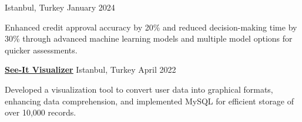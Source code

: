 \begin{cventries}
\cventry
    {} %
    {\href{https://github.com/hasantahabagci/Credit-Card-Approval-Prediction}{\textbf{}}} %
    {Istanbul, Turkey} %
    {January 2024} %
    {
      \begin{cvitems} %
        \item {Enhanced credit approval accuracy by 20\% and reduced decision-making time by 30\% through advanced machine learning models and multiple model options for quicker assessments.}
      \end{cvitems}
    }
\cventry
    {} %
    {\href{https://github.com/hasantahabagci/see-it-visualizer}{\textbf{\underline{See-It Visualizer}}}} %
    {Istanbul, Turkey} %
    {April 2022} %
    {
      \begin{cvitems} %
        \item {Developed a visualization tool to convert user data into graphical formats, enhancing data comprehension, and implemented MySQL for efficient storage of over 10,000 records.}
      \end{cvitems}
    }


\end{cventries}

